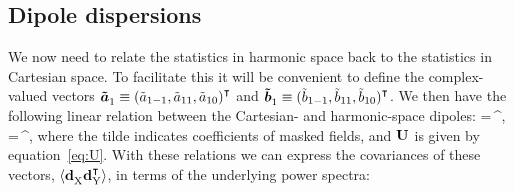 \subsection{Dipole dispersions}\label{app:stats-cut}
We now need to relate the statistics in harmonic space back to the statistics
in Cartesian space. To facilitate this it will be
convenient to define the complex-valued vectors
$\bm{\tilde{a}}\Z1\equiv(\tilde{a}_{1-1},\tilde{a}_{11},\tilde{a}_{10})\Zu\T$
and $\bm{\tilde{b}}\Z1\equiv(\tilde{b}_{1-1},\tilde{b}_{11},\tilde{b}_{10})\Zu\T$.
We then have the following linear relation between the Cartesian- and harmonic-space dipoles:
\be
    \dint=\,^\dagger\ssp{}, \quad
    \dkin=\,^\dagger\ssp{},
\ee
where the tilde indicates coefficients of masked fields, and ${\mathbf{U}}$ is given by equation~\eqref{eq:U}.
With these relations we can express the covariances of these vectors,
$\langle\mbf{d}_\mrm{X}^{\phantom\T}\mbf{d}_\mrm{Y}^\T\rangle$, in terms of the
underlying power spectra:
